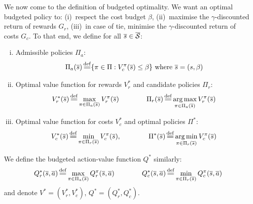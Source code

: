 \documentclass{article}
\begin{document}
\begin{definition}
We now come to the definition of budgeted optimality. We want an optimal budgeted policy to: (i)~respect the cost budget $\beta$, (ii)~maximise the $\gamma$-discounted return of rewards $G_r$, (iii)~in case of tie, minimise the $\gamma$-discounted return of costs $G_c$. To that end, we define for all $\overline{s}\in\overline{\mathcal{S}}$:
\begin{enumerate}[(i)]
    \item Admissible policies $\Pi_a$: 
    \begin{equation}
    \Pi_a(\os) \eqdef \{\pi\in\Pi: V_c^\pi(\os) \leq \beta\}\text{ where }\os = (s, \beta)
    \end{equation}
    \item Optimal value function for rewards $V_r^*$ and candidate policies $\Pi_r$: 
    \begin{equation}
        V_r^*(\os) \eqdef \max_{\pi\in\Pi_a(\os)}  V_r^\pi(\os) \qquad\qquad \Pi_r(\os) \eqdef \argmax_{\pi\in\Pi_a(\os)}  V_r^\pi(\os)
    \end{equation}
    \item Optimal value function for costs $V_c^*$ and optimal policies $\Pi^*$: 
    \begin{equation}
        V_c^*(\os) \eqdef \min_{\pi\in\Pi_r(\os)}  V_c^\pi(\os), \qquad\qquad \Pi^*(\os) \eqdef \argmin_{\pi\in\Pi_r(\os)}  V_c^\pi(\os)
    \end{equation}
\end{enumerate}
We define the budgeted action-value function $Q^*$ similarly:
\begin{equation}
    Q_r^*(\os, \oa) \eqdef \max_{\pi\in\Pi_a(\os)}  Q_r^\pi(\os, \oa) \qquad\qquad Q_c^*(\os, \oa) \eqdef \min_{\pi\in\Pi_r(\os)}  Q_c^\pi(\os, \oa) 
\end{equation}
and denote $V^* = (V_r^*, V_c^*)$, $Q^* = (Q_r^*, Q_c^*)$.
\end{definition}
\end{document}
